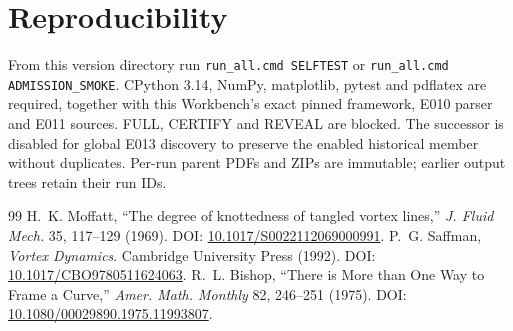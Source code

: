 \documentclass[11pt]{article}
\begin{document}
\section{Reproducibility}
From this version directory run \texttt{run\_all.cmd SELFTEST} or \texttt{run\_all.cmd ADMISSION\_SMOKE}. CPython 3.14, NumPy, matplotlib, pytest and pdflatex are required, together with this Workbench's exact pinned framework, E010 parser and E011 sources. FULL, CERTIFY and REVEAL are blocked. The successor is disabled for global E013 discovery to preserve the enabled historical member without duplicates. Per-run parent PDFs and ZIPs are immutable; earlier output trees retain their run IDs.
\begin{thebibliography}{99}
 H.~K. Moffatt, ``The degree of knottedness of tangled vortex lines,'' \emph{J. Fluid Mech.} 35, 117--129 (1969). DOI: \href{https://doi.org/10.1017/S0022112069000991}{10.1017/S0022112069000991}.
 P.~G. Saffman, \emph{Vortex Dynamics}. Cambridge University Press (1992). DOI: \href{https://doi.org/10.1017/CBO9780511624063}{10.1017/CBO9780511624063}.
 R.~L. Bishop, ``There is More than One Way to Frame a Curve,'' \emph{Amer. Math. Monthly} 82, 246--251 (1975). DOI: \href{https://doi.org/10.1080/00029890.1975.11993807}{10.1080/00029890.1975.11993807}.
\end{thebibliography}
\end{document}
